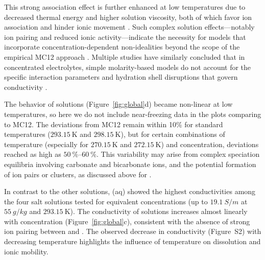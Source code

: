 \documentclass[journal=aesccq,manuscript=article]{achemso}
\begin{document}
This strong association effect is further enhanced at low temperatures due to decreased thermal energy and higher solution viscosity, both of which favor ion association and hinder ionic movement \citep{Anderko1997,kim_electrical_2019, zhang_experimental_2020}.
Such complex solution effects—notably ion pairing and reduced ionic activity—indicate the necessity for models that incorporate concentration-dependent non-idealities beyond the scope of the empirical MC12 approach \citep{rebello_correlations_2020, pan_electrical_2020}. 
Multiple studies have similarly concluded that in concentrated electrolytes, simple molarity-based models do not account for the specific interaction parameters and hydration shell disruptions that govern conductivity \citep{chalikian2001structural, toner2017lowtemperaturesulfate}. 

The behavior of  solutions (Figure~\ref{fig:global}d) became non-linear at low temperatures, so here we do not include near-freezing data in the plots comparing to MC12. 
The deviations from MC12 remain within 10\% for standard temperatures ($\SI{293.15}{\kelvin}$ and $\SI{298.15}{\kelvin}$), but for certain combinations of temperature (especially for $\SI{270.15}{\kelvin}$ and $\SI{272.15}{\kelvin}$) and concentration, deviations reached as high as $\SIrange{50}{60}{\percent}$. 
This variability may arise from complex speciation equilibria involving carbonate and bicarbonate ions, and the potential formation of ion pairs or clusters, as discussed above for .

In contrast to the other solutions, (aq) showed the highest conductivities among the four salt solutions tested for equivalent concentrations (up to $\SI{19.1}{S \per m}$ at $\SI{55}{g \per kg}$ and $\SI{293.15}{\kelvin}$). 
The conductivity of  solutions increases almost linearly with concentration (Figure~\ref{fig:global}c), consistent with the absence of strong ion pairing between  and .
The observed decrease in conductivity (Figure~S2) with decreasing temperature highlights the influence of temperature on dissolution and ionic mobility. 
\end{document}
